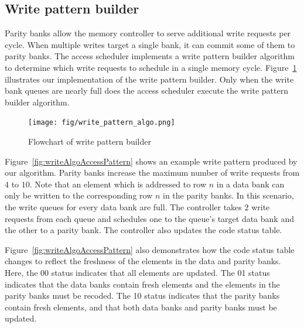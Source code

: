 \subsection{Write pattern builder}
\label{sec:writeCodingAlgo}
Parity banks allow the memory controller to serve additional write requests per cycle. When multiple writes target a single bank, it can commit some of them to parity banks. The access scheduler implements a write pattern builder algorithm to determine which write requests to schedule in a single memory cycle. Figure~\ref{fig:writeFlow} illustrates our implementation of the write pattern builder. Only when the write bank queues are nearly full does the access scheduler execute the write pattern builder algorithm. 


\begin{figure}[htbp]
\centering
	\texttt{[image: fig/write\_pattern\_algo.png]}
	\caption{{ Flowchart of write pattern builder}}
	\label{fig:writeFlow}
\end{figure}


Figure~\ref{fig:writeAlgoAccessPattern} shows an example write pattern produced by our algorithm. Parity banks increase the maximum number of write requests from $4$ to $10$. Note that an element which is addressed to row $n$ in a data bank can only be written to the corresponding row $n$ in the parity banks. In this scenario, the write queues for every data bank are full. The controller takes $2$ write requests from each queue and schedules one to the queue's target data bank and the other to a parity bank. The controller also updates the code status table.

{\color{red}
Figure~\ref{fig:writeAlgoAccessPattern} also demonstrates how the code status table changes to reflect the freshness of the elements in the data and parity banks. Here, the 00 status indicates that all elements are updated. The 01 status indicates that the data banks contain fresh elements and the elements in the parity banks must be recoded. The 10 status indicates that the parity banks contain fresh elements, and that both data banks and parity banks must be updated.
}

